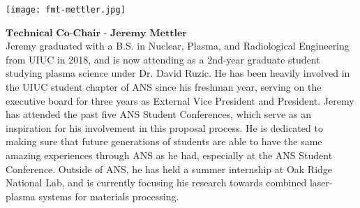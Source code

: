\begin{minipage}{0.25\textwidth}
	\centering
	\texttt{[image: fmt-mettler.jpg]}
\end{minipage}
\begin{minipage}{0.73\textwidth}
	$\textbf{Technical Co-Chair - Jeremy Mettler}$\\
Jeremy graduated with a B.S. in Nuclear, Plasma, and Radiological Engineering from UIUC in 2018, and is now attending as a 2nd-year graduate student studying plasma science under Dr. David Ruzic. He has been heavily involved in the UIUC student chapter of ANS since his freshman year, serving on the executive board for three years as External Vice President and President. Jeremy has attended the past five ANS Student Conferences, which serve as an inspiration for his involvement in this proposal process. He is dedicated to making sure that future generations of students are able to have the same amazing experiences through ANS as he had, especially at the ANS Student Conference. Outside of ANS, he has held a summer internship at Oak Ridge National Lab, and is currently focusing his research towards combined laser-plasma systems for materials processing.
\end{minipage}

